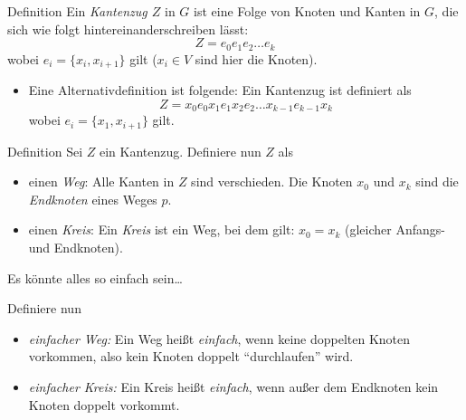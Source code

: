 \documentclass{beamer}
\begin{document}
\begin{frame}
	\begin{block}{Definition}
		Ein \emph{Kantenzug $Z$} in $G$ ist eine Folge von Knoten und Kanten in $G$, die sich wie folgt hintereinanderschreiben lässt:
    \begin{equation*}
			Z = e_0e_1e_2 \ldots e_k
		\end{equation*}
    wobei $e_i = \{x_i, x_{i+1}\}$ gilt ($x_i \in V$ sind hier die Knoten).
	\end{block}
    \begin{itemize}
        \item Eine Alternativdefinition ist folgende: Ein Kantenzug ist definiert als
        \begin{equation*}
            Z = x_0e_0x_1e_1x_2e_2 \ldots x_{k-1}e_{k-1}x_k
        \end{equation*}
        wobei $e_i = \{x_1, x_{i+1}\}$ gilt.
    \end{itemize}
\end{frame}

\begin{frame}
	\begin{block}{Definition}
		Sei $Z$ ein Kantenzug. Definiere nun $Z$ als
		\begin{itemize}
			\item einen \emph{Weg}: Alle Kanten in $Z$ sind verschieden. Die Knoten $x_0$ und $x_k$ sind die \emph{Endknoten} eines Weges $p$. 
			\item einen \emph{Kreis}: Ein \emph{Kreis} ist ein Weg, bei dem gilt: $x_0 = x_k$ (gleicher Anfangs- und Endknoten).
		\end{itemize}
	\end{block}
\end{frame}

\begin{frame}{Es könnte alles so einfach sein\ldots}
	\begin{block}{Definiere nun}
		\begin{itemize}
			\item \emph{einfacher Weg:} Ein Weg heißt \emph{einfach}, wenn keine doppelten Knoten vorkommen, also kein Knoten doppelt "`durchlaufen"' wird.
			\item \emph{einfacher Kreis:} Ein Kreis heißt \emph{einfach}, wenn außer dem Endknoten kein Knoten doppelt vorkommt. 
		\end{itemize}
	\end{block}

\end{frame}
\end{document}
